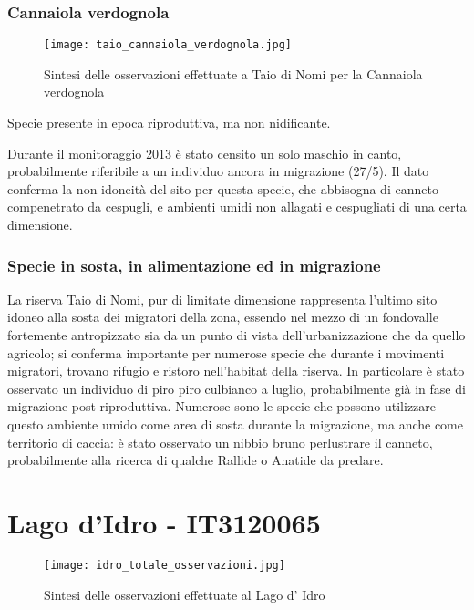 \documentclass[11pt,a4paper,twoside]{memoir}
\begin{document}
\subsubsection{Cannaiola verdognola}
\vspace*{\fill}
\begin{figure}[H]
  \centering
  \texttt{[image: taio\_cannaiola\_verdognola.jpg]}
  \caption{Sintesi delle osservazioni effettuate a Taio di Nomi per la Cannaiola verdognola}
\end{figure}\vspace*{\fill}
Specie presente in epoca riproduttiva, ma non nidificante. 

Durante il monitoraggio 2013 è stato censito un solo maschio in canto, probabilmente riferibile a un individuo ancora in migrazione (27/5). Il dato conferma la non idoneità del sito per questa specie, che abbisogna di canneto compenetrato da cespugli, e ambienti umidi non allagati e cespugliati di una certa dimensione.

\subsubsection{Specie in sosta, in alimentazione ed in migrazione}
La riserva Taio di Nomi, pur di limitate dimensione rappresenta l'ultimo sito idoneo alla sosta dei migratori della zona, essendo  nel mezzo di un fondovalle fortemente antropizzato sia da un punto di vista dell'urbanizzazione che da quello agricolo; si conferma importante per numerose specie che durante i movimenti migratori, trovano rifugio e ristoro nell'habitat della riserva. In particolare è stato osservato un individuo di piro piro culbianco a luglio, probabilmente già in fase di migrazione post-riproduttiva.
 Numerose sono le specie che possono utilizzare questo ambiente umido come area di sosta durante la migrazione, ma anche come territorio di caccia: è stato osservato un nibbio bruno perlustrare il canneto, probabilmente alla ricerca di qualche Rallide o Anatide da predare.

\newpage
 \section{Lago d'Idro - IT3120065}

\vspace*{\fill} \begin{figure}[H]
  \centering
  \texttt{[image: idro\_totale\_osservazioni.jpg]}
  \caption{Sintesi delle osservazioni effettuate al Lago d' Idro}
\end{figure}\vspace*{\fill}
\end{document}
